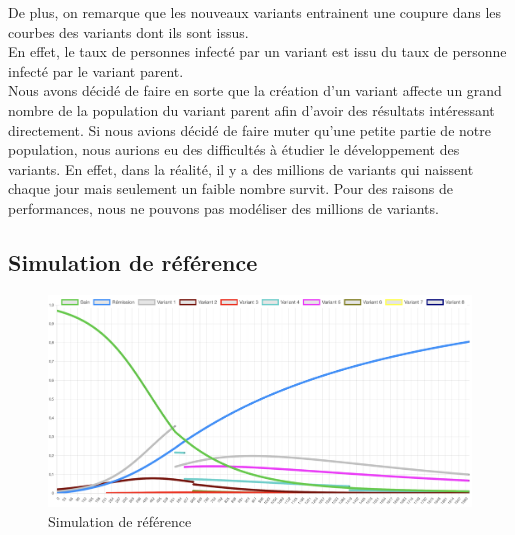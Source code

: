 \documentclass{article}
\begin{document}
De plus, on remarque que les nouveaux variants entrainent une coupure dans les courbes des variants dont ils sont issus. \\
En effet, le taux de personnes infecté par un variant est issu du taux de personne infecté par le variant parent. \\
Nous avons décidé de faire en sorte que la création d'un variant affecte un grand nombre de la population du variant parent afin d'avoir des résultats intéressant directement. Si nous avions décidé de faire muter qu'une petite partie de notre population, nous aurions eu des difficultés à étudier le développement des variants. En effet, dans la réalité, il y a des millions de variants qui naissent chaque jour mais seulement un faible nombre survit. Pour des raisons de performances, nous ne pouvons pas modéliser des millions de variants.

\subsection{Simulation de référence}

\begin{figure}[h]
    \includegraphics[width=\linewidth]{images/Simulation1.png}
    \caption{Simulation de référence}
    \label{fig:simulation1}
\end{figure}
\end{document}
